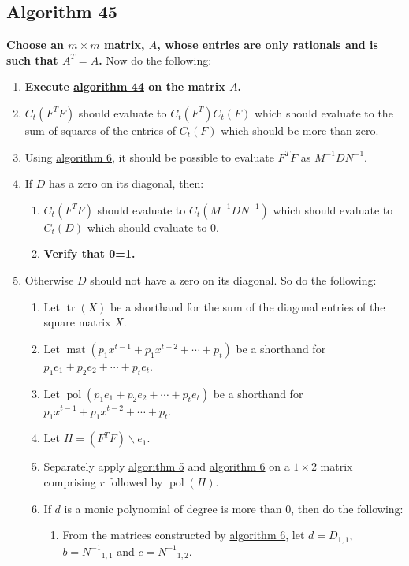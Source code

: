 \documentclass[twocolumn]{article}
\DeclareMathOperator{\mat}{mat}
\DeclareMathOperator{\pol}{pol}
\DeclareMathOperator{\tr}{tr}
\begin{document}
		\subsection{Algorithm 45}\label{sec:algorithm 45}
			\textbf{Choose an $m\times m$ matrix, $A$, whose entries are only rationals and is such that $A^T=A$.} Now do the following:
			\begin{enumerate}
				\item \textbf{Execute \hyperref[sec:algorithm 44]{algorithm 44} on the matrix $A$.}
				\item $C_t(F^TF)$ should evaluate to $C_t(F^T)C_t(F)$ which should evaluate to the sum of squares of the entries of $C_t(F)$ which should be more than zero.
				\item Using \hyperref[sec:algorithm 6]{algorithm 6}, it should be possible to evaluate $F^TF$ as $M^{-1}DN^{-1}$.
				\item If $D$ has a zero on its diagonal, then:
				\begin{enumerate}
					\item $C_t(F^TF)$ should evaluate to $C_t(M^{-1}DN^{-1})$ which should evaluate to $C_t(D)$ which should evaluate to $0$.
					\item \textbf{Verify that 0=1.}
				\end{enumerate}
				\item Otherwise $D$ should not have a zero on its diagonal. So do the following:
				\begin{enumerate}
					\item Let $\tr(X)$ be a shorthand for the sum of the diagonal entries of the square matrix $X$.
					\item Let $\mat(p_1x^{t-1}+p_1x^{t-2}+\cdots+p_t)$ be a shorthand for $p_1e_1+p_2e_2+\cdots+p_te_t$.
					\item Let $\pol(p_1e_1+p_2e_2+\cdots+p_te_t)$ be a shorthand for $p_1x^{t-1}+p_1x^{t-2}+\cdots+p_t$.
					\item Let $H=(F^TF)\backslash e_1$.
					\item Separately apply \hyperref[sec:algorithm 5]{algorithm 5} and \hyperref[sec:algorithm 6]{algorithm 6} on a $1\times 2$ matrix comprising $r$ followed by $\pol(H)$.
					\item If $d$ is a monic polynomial of degree is more than $0$, then do the following:
					\begin{enumerate}
						\item From the matrices constructed by \hyperref[sec:algorithm 6]{algorithm 6}, let $d=D_{1,1}$, $b={N^{-1}}_{1,1}$ and $c={N^{-1}}_{1,2}$.

\end{enumerate}
\end{enumerate}
\end{enumerate}
\end{document}
